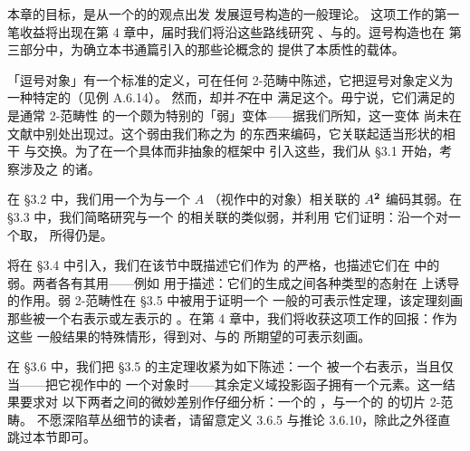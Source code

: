 本章的目标，是从一个\trInfinityCosmos{}的\trHomotopyTwoCategory{}的观点出发%
发展逗号构造的一般理论。
这项工作的第一笔收益将出现在第 4 章中，届时我们将沿这些路线研究%
\trAdjunction{}、\trLimit{}与\trColimit{}的\trUniversalProperty。逗号构造也在%
第三部分中，为确立本书通篇引入的那些\trCategory{}论概念的%
\trModelIndependence{}提供了本质性的载体。

「逗号对象」有一个标准的定义，可在任何 2-范畴中陈述，它把逗号对象定义为%
一种特定的\trWeightedLimit{}（见例 A.6.14）。
然而，\trCommaInfinityCategory{}却并\emph{不}在\trHomotopyTwoCategory{}中%
满足这个\trUniversalProperty。毋宁说，它们满足的是通常 2-范畴性%
\trUniversalProperty{}的一个颇为特别的「弱」变体——据我们所知，这一变体%
尚未在文献中别处出现过。这个弱\trUniversalProperty{}由我们称之为%
\trSmotheringFunctor{}的东西来编码，它关联起适当形状的\trHomotopy{}相干%
\trDiagram{}与\trHomotopy{}交换\trDiagram。为了在一个具体而非抽象的框架中%
引入这些\trUniversalProperty，我们从 §3.1 开始，考察涉及\trQuasiCategory{}之%
\trHomotopyCategory{}的诸\trSmotheringFunctor{}。

在 §3.2 中，我们用一个\trSmotheringFunctor{}为与一个\trInfinityCategory{} $A$%
（视作\trHomotopyTwoCategory{}中的对象）相关联的\trArrowInfinityCategory{}%
$A^{\mathbf{2}}$ 编码其弱\trUniversalProperty。在 §3.3 中，我们简略研究与一个%
\trIsofibration{}的\trPullback{}相关联的类似弱\trUniversalProperty，并利用%
它们证明：沿一个\trIsofibration{}对一个\trEquivalence{}取\trPullback{}，%
所得仍是\trEquivalence。

\trCommaInfinityCategory{}将在 §3.4 中引入，我们在该节中既描述它们作为%
\trSimpliciallyEnrichedLimit{}的严格\trUniversalProperty，也描述它们在%
\trHomotopyTwoCategory{}中的弱\trUniversalProperty。两者各有其用——例如%
用于描述：它们的生成\trCospan{}之间各种类型的态射在\trCommaInfinityCategory{}%
上诱导的作用。弱 2-范畴性\trUniversalProperty{}在 §3.5 中被用于证明一个%
一般的可表示性定理，该定理刻画那些被一个\trFunctor{}右表示或左表示的%
\trCommaInfinityCategory{}。在第 4 章中，我们将收获这项工作的回报：作为这些%
一般结果的特殊情形，得到对\trAdjunction{}、\trLimit{}与\trColimit{}的%
所期望的可表示刻画。

在 §3.6 中，我们把 §3.5 的主定理收紧为如下陈述：一个\trCommaInfinityCategory{}%
被一个\trFunctor{}右表示，当且仅当——把它视作\trSliceInfinityCosmos{}中的%
一个对象时——其余定义域投影函子拥有一个\trTerminal{}元素。这一结果要求对%
以下两者之间的微妙差别作仔细分析：一个\trSliceInfinityCosmos{}的%
\trHomotopyTwoCategory{}，与一个\trInfinityCosmos{}的\trHomotopyTwoCategory{}%
的切片 2-范畴。
不愿深陷草丛细节的读者，请留意定义 3.6.5 与推论 3.6.10，除此之外径直%
跳过本节即可。

